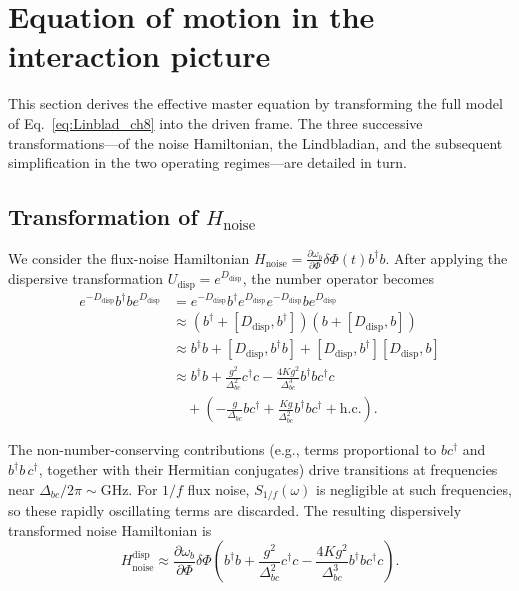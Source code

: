 \section{Equation of motion in the interaction picture}
\label{sec:eom_interaction}

This section derives the effective master equation by transforming the full model of Eq.~\eqref{eq:Linblad_ch8} into the driven frame. The three successive transformations---of the noise Hamiltonian, the Lindbladian, and the subsequent simplification in the two operating regimes---are detailed in turn.

\subsection{Transformation of $H_{\text{noise}}$}
\label{subsec:Hnoise_transfer}
We consider the flux-noise Hamiltonian
$H_{\text{noise}} = \frac{\partial \omega_b}{\partial \Phi} \delta \Phi(t) b^\dagger b$.
After applying the dispersive transformation $U_{\text{disp}} = e^{D_{\text{disp}}}$, the number operator becomes
\begin{align}
    e^{-D_{\text{disp}}} b^\dagger b e^{D_{\text{disp}}} &= e^{-D_{\text{disp}}} b^\dagger e^{D_{\text{disp}}} e^{-D_{\text{disp}}} b e^{D_{\text{disp}}} \nonumber \\
    &\approx \left( b^\dagger + [D_{\text{disp}}, b^\dagger] \right) \left( b + [D_{\text{disp}}, b] \right) \nonumber \\
    &\approx b^\dagger b + [D_{\text{disp}}, b^\dagger b] + [D_{\text{disp}}, b^\dagger][D_{\text{disp}}, b] \nonumber \\
    &\approx b^\dagger b + \frac{g^2}{\Delta_{bc}^2} c^\dagger c - \frac{4Kg^2}{\Delta_{bc}^3} b^\dagger b c^\dagger c \nonumber \\
    &\quad + \left( -\frac{g}{\Delta_{bc}} b c^\dagger + \frac{Kg}{\Delta_{bc}^2} b^\dagger b c^\dagger + \text{h.c.} \right).
\end{align}

The non-number-conserving contributions (e.g., terms proportional to $b c^\dagger$ and $b^\dagger b\,c^\dagger$, together with their Hermitian conjugates) drive transitions at frequencies near $\Delta_{bc}/2\pi\sim\mathrm{GHz}$. For $1/f$ flux noise, $S_{1/f}(\omega)$ is negligible at such frequencies, so these rapidly oscillating terms are discarded. The resulting dispersively transformed noise Hamiltonian is
\begin{equation}
    H_{\text{noise}}^{\text{disp}} \approx \frac{\partial \omega_b}{\partial \Phi} \delta \Phi \left( b^\dagger b + \frac{g^2}{\Delta_{bc}^2} c^\dagger c - \frac{4Kg^2}{\Delta_{bc}^3} b^\dagger b c^\dagger c \right).
\end{equation}


